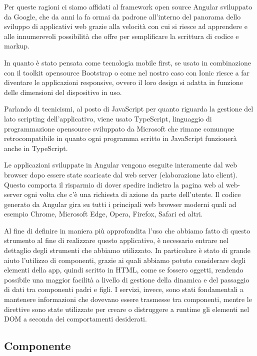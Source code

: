 Per queste ragioni ci siamo affidati al framework open source Angular sviluppato da Google, che da anni la fa ormai da padrone all'interno del panorama dello sviluppo di applicativi web grazie alla velocità con cui si riesce ad apprendere e alle innumerevoli possibilità che offre per semplificare la scrittura di codice e markup.

In quanto è stato pensata come tecnologia mobile first, se usato in combinazione con il toolkit opensource Bootstrap o come nel nostro caso con Ionic riesce a far diventare le applicazioni responsive, ovvero il loro design si adatta in funzione delle dimensioni del dispositivo in uso.

Parlando di tecnicismi, al posto di JavaScript per quanto riguarda la gestione del lato scripting dell'applicativo, viene usato TypeScript, linguaggio di programmazione opensource sviluppato da Microsoft che rimane comunque retrocompatibile in quanto ogni programma scritto in JavaScript funzionerà anche in TypeScript.

Le applicazioni sviluppate in Angular vengono eseguite interamente dal web browser dopo essere state scaricate dal web server (elaborazione lato client). Questo comporta il risparmio di dover spedire indietro la pagina web al web-server ogni volta che c'è una richiesta di azione da parte dell'utente. Il codice generato da Angular gira su tutti i principali web browser moderni quali ad esempio Chrome, Microsoft Edge, Opera, Firefox, Safari ed altri.

Al fine di definire in maniera più approfondita l'uso che abbiamo fatto di questo strumento al fine di realizzare questo applicativo, è necessario entrare nel dettaglio degli strumenti che abbiamo utilizzato. In particolare è stato di grande aiuto l'utilizzo di componenti, grazie ai quali abbiamo potuto considerare degli elementi della app, quindi scritto in HTML, come se fossero oggetti, rendendo possibile una maggior facilità a livello di gestione della dinamica e del passaggio di dati tra componenti padri e figli. I servizi, invece, sono stati fondamentali a mantenere informazioni che dovevano essere trasmesse tra componenti, mentre le direttive sono state utilizzate per creare o distruggere a runtime gli elementi nel DOM a seconda dei comportamenti desiderati.
\subsection{Componente} 

